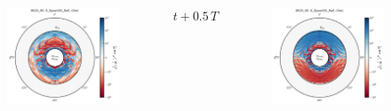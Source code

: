 \documentclass{beamer}
\begin{document}
\begin{frame}
\begin{columns}[c]
\begin{figure}[htb!]
        \includegraphics[width=\textwidth]{fig.DivV2_0.25T.png}
      \end{figure}
      \centerline{$t+0.5\,T$}
      \begin{figure}[htb!]
        \centering
        \includegraphics[width=\textwidth]{fig.DivV2_0.50T.png}
      \end{figure}
  \end{columns}

\end{frame}
\end{document}
